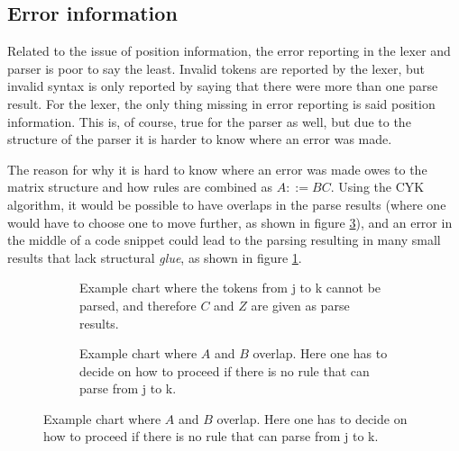 \documentclass[a4paper,12pt,twosided]{report}
\newcommand{\subt}[3] { 
  \draw[grid] (#1,#1) -- (#1,#2) node[inChart] {#3} -- (#2,#2);
  \fill[color=black] (#1,#2) circle (2pt)
 }
\newcommand{\mrk}[2]{\node[inChart] at (#1,#1) {#2}}
\begin{document}
\subsection{Error information}
Related to the issue of position information, the error reporting in the lexer
and parser is poor to say the least. Invalid tokens are reported by the lexer,
but invalid syntax is only reported by saying that there were more than one
parse result. For the lexer, the only thing missing in error reporting is
said position information. This is, of course, true for the parser as well, but
due to the structure of the parser it is harder to know where an error was made.

The reason for why it is hard to know where an error was made owes to the matrix
structure and how rules are combined as $A ::= BC$. Using the CYK algorithm, it
would be possible to have overlaps in the parse results (where one would have to
choose one to move further, as shown in figure \ref{parseoverlap}), and an error
in the middle of a code snippet could lead to the parsing resulting in many
small results that lack structural \textit{glue}, as shown in figure
\ref{missingglue}. 

\begin{figure}[H]
  \centering
  \begin{subfigure}[H]{.4\textwidth}
    \flushleft
     \caption{\label{missingglue}Example chart where the tokens from j to k
     cannot be parsed, and therefore $C$ and $Z$ are given as parse results.}
  \end{subfigure}
  \begin{subfigure}[H]{.1\textwidth}
  \text{}
  \end{subfigure}
  \begin{subfigure}[H]{.4\textwidth}
    \flushright
    \caption{\label{parseoverlap} Example chart where $A$ and $B$ overlap. Here one
    has to decide on how to proceed if there is no rule that can parse from j to
    k.}
  \end{subfigure}
\end{figure}
\end{document}
